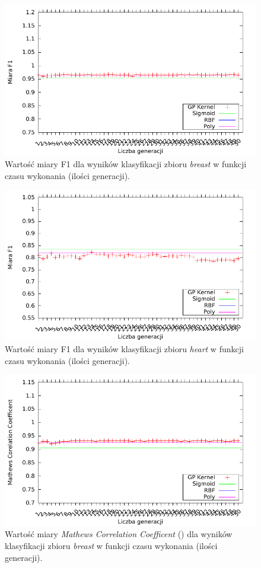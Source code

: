	\begin{figure}
		\includegraphics[scale=0.90]{figures/results/f1/f1-breast}
		\caption{Wartość miary F1 dla wyników klasyfikacji zbioru \emph{breast} w funkcji czasu wykonania (ilości generacji).\label{fig:f1-breast}}
	\end{figure}
	
	\begin{figure}
		\includegraphics[scale=0.90]{figures/results/f1/f1-heart}
		\caption{Wartość miary F1 dla wyników klasyfikacji zbioru \emph{heart} w funkcji czasu wykonania (ilości generacji).\label{fig:f1-heart}}
	\end{figure}
	
	\begin{figure}
		\includegraphics[scale=0.90]{figures/results/mcc/mcc-breast}
		\caption{Wartość miary \emph{Mathews Correlation Coefficent} () dla wyników klasyfikacji zbioru \emph{breast} w funkcji czasu wykonania (ilości generacji).\label{fig:mcc-breast}}
	\end{figure}
	
